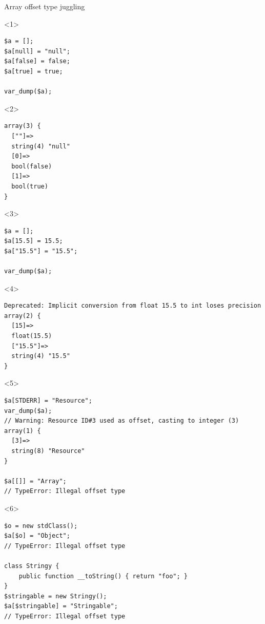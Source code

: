 \documentclass[aspectratio=169]{beamer}
\begin{document}
\begin{frame}[fragile]{Array offset type juggling}
    \begin{onlyenv}<1>
        \begin{verbatim}
$a = [];
$a[null] = "null";
$a[false] = false;
$a[true] = true;

var_dump($a);
        \end{verbatim}
    \end{onlyenv}
    \begin{onlyenv}<2>
        \begin{verbatim}
array(3) {
  [""]=>
  string(4) "null"
  [0]=>
  bool(false)
  [1]=>
  bool(true)
}
        \end{verbatim}
    \end{onlyenv}
    \begin{onlyenv}<3>
        \begin{verbatim}
$a = [];
$a[15.5] = 15.5;
$a["15.5"] = "15.5";

var_dump($a);
        \end{verbatim}
    \end{onlyenv}
    \begin{onlyenv}<4>
        \begin{verbatim}
Deprecated: Implicit conversion from float 15.5 to int loses precision
array(2) {
  [15]=>
  float(15.5)
  ["15.5"]=>
  string(4) "15.5"
}
        \end{verbatim}
    \end{onlyenv}
    \begin{onlyenv}<5>
        \begin{verbatim}
$a[STDERR] = "Resource";
var_dump($a);
// Warning: Resource ID#3 used as offset, casting to integer (3)
array(1) {
  [3]=>
  string(8) "Resource"
}

$a[[]] = "Array";
// TypeError: Illegal offset type
        \end{verbatim}
    \end{onlyenv}
    \begin{onlyenv}<6>
        \begin{verbatim}
$o = new stdClass();
$a[$o] = "Object";
// TypeError: Illegal offset type

class Stringy {
    public function __toString() { return "foo"; }
}
$stringable = new Stringy();
$a[$stringable] = "Stringable";
// TypeError: Illegal offset type
        \end{verbatim}
    \end{onlyenv}
\end{frame}
\end{document}
